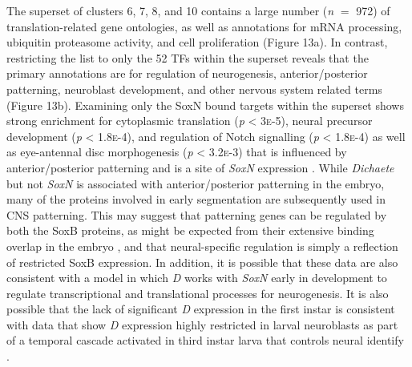 \documentclass[withindex,glossary]{cam-thesis}
\begin{document}
The superset of clusters 6, 7, 8, and 10 contains a large number
(\emph{n} $=$ 972) of translation-related gene ontologies, as well as
annotations for mRNA processing, ubiquitin proteasome activity, and cell
proliferation (Figure 13a). In contrast, restricting the list to only
the 52 TFs within the superset reveals that the primary annotations are
for regulation of neurogenesis, anterior/posterior patterning,
neuroblast development, and other nervous system related terms (Figure
13b). Examining only the SoxN bound targets within the superset shows
strong enrichment for cytoplasmic translation (\emph{p} \textless{}
3\textsc{e}-5), neural precursor development (\emph{p} \textless{} 1.8\textsc{e}-4), and
regulation of Notch signalling (\emph{p} \textless{} 1.8\textsc{e}-4) as well as
eye-antennal disc morphogenesis (\emph{p} \textless{} 3.2\textsc{e}-3) that is
influenced by anterior/posterior patterning 
and is a site of \emph{SoxN} expression . While
\emph{Dichaete} but not \emph{SoxN} is associated with
anterior/posterior patterning in the embryo, many of the proteins
involved in early segmentation are subsequently used in CNS patterning.
This may suggest that patterning genes can be regulated by both the SoxB
proteins, as might be expected from their extensive binding overlap in
the embryo , and that neural-specific regulation
is simply a reflection of restricted SoxB expression. In addition, it is
possible that these data are also consistent with a model in which
\emph{D} works with \emph{SoxN} early in development to regulate
transcriptional and translational processes for neurogenesis. It is also
possible that the lack of significant \emph{D} expression in the first
instar is consistent with data that show \emph{D} expression highly
restricted in larval neuroblasts as part of a temporal cascade activated
in third instar larva that controls neural identify .
\end{document}

